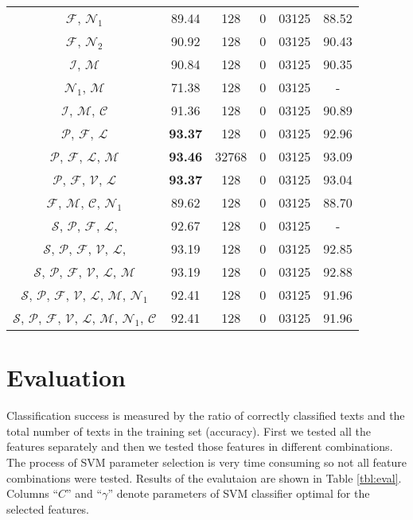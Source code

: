 \documentclass{llncs}
\begin{document}
\begin{table*}[htb]
\begin{center}
\begin{tabular}{c c c r@{.}l@{~~} c}
$\mathcal{F}$, $\mathcal{N}_1$ & 89.44 & 128 & 0 & 03125 & 88.52\\
$\mathcal{F}$, $\mathcal{N}_2$ & 90.92 & 128 & 0 & 03125 & 90.43\\
$\mathcal{I}$, $\mathcal{M}$ & 90.84 & 128 & 0 & 03125 & 90.35\\
$\mathcal{N}_1$, $\mathcal{M}$ & 71.38 & 128 & 0 & 03125 & -\\
$\mathcal{I}$, $\mathcal{M}$, $\mathcal{C}$ & 91.36 & 128 & 0 & 03125 & 90.89\\
$\mathcal{P}$, $\mathcal{F}$, $\mathcal{L}$ & \textbf{93.37} & 128 & 0 & 03125
& 92.96\\
$\mathcal{P}$, $\mathcal{F}$, $\mathcal{L}$, $\mathcal{M}$ & \textbf{93.46} &
32768 & 0 & 03125 & 93.09\\
$\mathcal{P}$, $\mathcal{F}$, $\mathcal{V}$, $\mathcal{L}$ & \textbf{93.37} &
128 & 0 & 03125 & 93.04\\
$\mathcal{F}$, $\mathcal{M}$, $\mathcal{C}$, $\mathcal{N}_1$ & 89.62 & 128 & 0
& 03125 & 88.70\\
$\mathcal{S}$, $\mathcal{P}$, $\mathcal{F}$, $\mathcal{L}$, & 92.67 & 128 & 0 &
03125 & -\\
$\mathcal{S}$, $\mathcal{P}$, $\mathcal{F}$, $\mathcal{V}$, $\mathcal{L}$, &
93.19 & 128 & 0 & 03125 & 92.85\\
$\mathcal{S}$, $\mathcal{P}$, $\mathcal{F}$, $\mathcal{V}$, $\mathcal{L}$,
$\mathcal{M}$ & 93.19 & 128 & 0 & 03125 & 92.88\\
$\mathcal{S}$, $\mathcal{P}$, $\mathcal{F}$, $\mathcal{V}$, $\mathcal{L}$,
$\mathcal{M}$, $\mathcal{N}_1$ & 92.41 & 128 & 0 & 03125 & 91.96\\
$\mathcal{S}$, $\mathcal{P}$, $\mathcal{F}$, $\mathcal{V}$, $\mathcal{L}$,
$\mathcal{M}$, $\mathcal{N}_1$, $\mathcal{C}$ & 92.41 & 128 & 0 & 03125 &
91.96\\ \bottomrule%
\end{tabular}%
\label{tbl:eval}%
\end{center}
\end{table*}

\section{Evaluation}
\label{sec:evaluacija}
Classification success is measured by the ratio of correctly classified texts and
the total number of texts in the training set (accuracy). First we tested all the
features separately and then we tested those features in different combinations.
The process of SVM parameter selection is very time consuming so not all feature
combinations were tested. Results of the evalutaion are shown in Table
\ref{tbl:eval}. Columns ``$C$'' and ``$\gamma$'' denote parameters of SVM
classifier optimal for the selected features.
\end{document}
